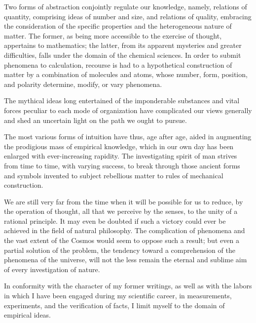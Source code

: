 Two forms of abstraction conjointly regulate our knowledge, namely, relations of quantity, comprising ideas of number and size, and relations of quality, embracing the consideration of the specific properties and the heterogeneous nature of matter. The former, as being more accessible to the exercise of thought, appertains to mathematics; the latter, from its apparent mysteries and greater difficulties, falls under the domain of the chemical sciences. In order to submit phenomena to calculation, recourse is had to a hypothetical construction of matter by a combination of molecules and atoms, whose number, form, position, and polarity determine, modify, or vary phenomena.

The mythical ideas long entertained of the imponderable substances and vital forces peculiar to each mode of organization have complicated our views generally and shed an uncertain light on the path we ought to pursue.

The most various forms of intuition have thus, age after age, aided in augmenting the prodigious mass of empirical knowledge, which in our own day has been enlarged with ever-increasing rapidity. The investigating spirit of man strives from time to time, with varying success, to break through those ancient forms and symbols invented to subject rebellious matter to rules of mechanical construction.

We are still very far from the time when it will be possible for us to reduce, by the operation of thought, all that we perceive by the senses, to the unity of a rational principle. It may even be doubted if such a victory could ever be achieved in the field of natural philosophy. The complication of phenomena and the vast extent of the Cosmos would seem to oppose such a result; but even a partial solution of the problem, the tendency toward a comprehension of the phenomena of the universe, will not the less remain the eternal and sublime aim of every investigation of nature.

In conformity with the character of my former writings, as well as with the labors in which I have been engaged during my scientific career, in measurements, experiments, and the verification of facts, I limit myself to the domain of empirical ideas.

